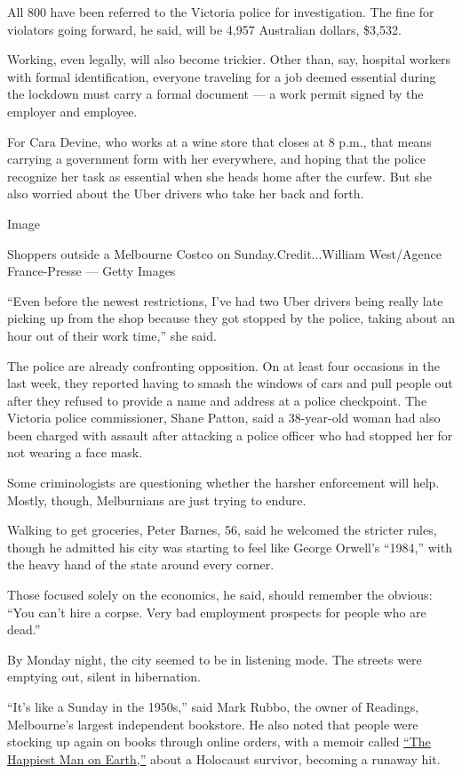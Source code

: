 All 800 have been referred to the Victoria police for investigation. The
fine for violators going forward, he said, will be 4,957 Australian
dollars, \$3,532.

Working, even legally, will also become trickier. Other than, say,
hospital workers with formal identification, everyone traveling for a
job deemed essential during the lockdown must carry a formal document
--- a work permit signed by the employer and employee.

For Cara Devine, who works at a wine store that closes at 8 p.m., that
means carrying a government form with her everywhere, and hoping that
the police recognize her task as essential when she heads home after the
curfew. But she also worried about the Uber drivers who take her back
and forth.

Image

Shoppers outside a Melbourne Costco on Sunday.Credit...William
West/Agence France-Presse --- Getty Images

``Even before the newest restrictions, I've had two Uber drivers being
really late picking up from the shop because they got stopped by the
police, taking about an hour out of their work time,'' she said.

The police are already confronting opposition. On at least four
occasions in the last week, they reported having to smash the windows of
cars and pull people out after they refused to provide a name and
address at a police checkpoint. The Victoria police commissioner, Shane
Patton, said a 38-year-old woman had also been charged with assault
after attacking a police officer who had stopped her for not wearing a
face mask.

Some criminologists are questioning whether the harsher enforcement will
help. Mostly, though, Melburnians are just trying to endure.

Walking to get groceries, Peter Barnes, 56, said he welcomed the
stricter rules, though he admitted his city was starting to feel like
George Orwell's ``1984,'' with the heavy hand of the state around every
corner.

Those focused solely on the economics, he said, should remember the
obvious: ``You can't hire a corpse. Very bad employment prospects for
people who are dead.''

By Monday night, the city seemed to be in listening mode. The streets
were emptying out, silent in hibernation.

``It's like a Sunday in the 1950s,'' said Mark Rubbo, the owner of
Readings, Melbourne's largest independent bookstore. He also noted that
people were stocking up again on books through online orders, with a
memoir called
\href{https://www.readings.com.au/products/32836563/the-happiest-man-on-earth}{``The
Happiest Man on Earth,''} about a Holocaust survivor, becoming a runaway
hit.

